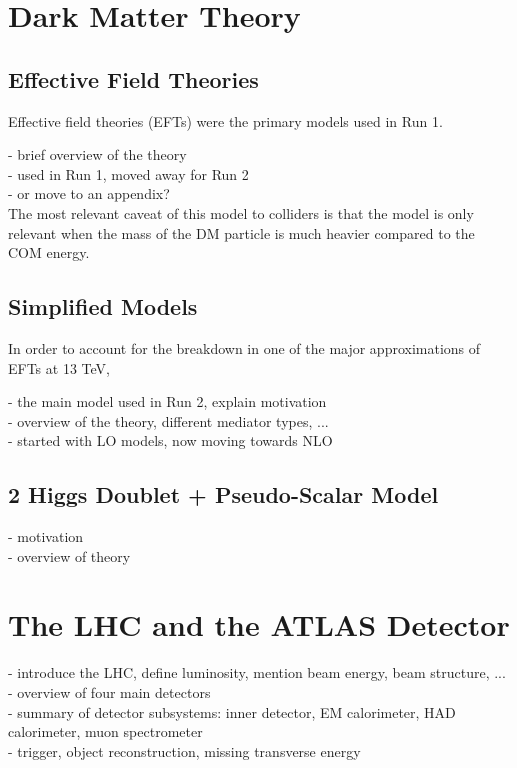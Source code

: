 \label{chapter:theory}

\section{Dark Matter Theory}

\subsection{Effective Field Theories}

Effective field theories (EFTs) were the primary models used in Run 1.

- brief overview of the theory\\
- used in Run 1, moved away for Run 2\\
- or move to an appendix?\\

The most relevant caveat of this model to colliders is that the model is only relevant when the mass of the DM particle is much heavier compared to the COM energy.

\subsection{Simplified Models}

In order to account for the breakdown in one of the major approximations of EFTs at 13 TeV, 

- the main model used in Run 2, explain motivation\\
- overview of the theory, different mediator types, ...\\
- started with LO models, now moving towards NLO\\

\subsection{2 Higgs Doublet + Pseudo-Scalar Model}

- motivation\\
- overview of theory\\

\section{The LHC and the ATLAS Detector}

- introduce the LHC, define luminosity, mention beam energy, beam structure, ...\\
- overview of four main detectors\\
- summary of detector subsystems: inner detector, EM calorimeter, HAD calorimeter, muon spectrometer\\
- trigger, object reconstruction, missing transverse energy\\